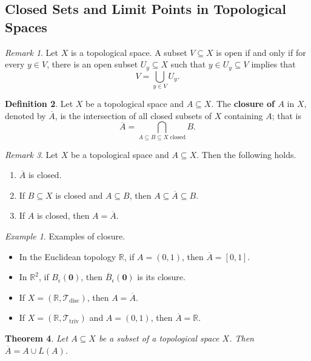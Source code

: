 \documentclass[ 12pt ]{article}
\newcounter{lecture_num}
\theoremstyle{plain}
\theoremstyle{plain}
\newtheorem{theorem}{Theorem}[lecture_num]
\theoremstyle{definition}
\newtheorem{definition}[theorem]{Definition}
\theoremstyle{remark}
\newtheorem{remark}[theorem]{Remark}
\newtheorem*{example*}{Example}
\begin{document}
\subsection*{Closed Sets and Limit Points in Topological Spaces}

\begin{remark}
	Let $X$ is a topological space. A subset $V \subseteq X$ is open if and only if for every $y \in V$, there is an open subset $U_y \subseteq X$ such that $y \in U_y \subseteq V$
	implies that $$V = \bigcup_{y \in V} U_y.$$
\end{remark}

\begin{definition}
	Let $X$ be a topological space and $A \subseteq X$. The \textbf{closure of $A$} in $X$, denoted by $\overline{A}$, is the intersection of all closed subsets of $X$ containing $A$;
	that is $$\overline{A} = \bigcap_{ A \subseteq B \subseteq X\; \mathrm{closed} } B.$$
\end{definition}

\begin{remark}
	Let $X$ be a topological space and $A \subseteq X$. Then the following holds.
	\begin{enumerate}
		\item $\overline{A}$ is closed.
		\item If $B \subseteq X$ is closed and $A \subseteq B$, then $A \subseteq \overline{A} \subseteq B$.
		\item If $A$ is closed, then $A = \overline{A}$.
	\end{enumerate}
\end{remark}

\begin{example*}
	Examples of closure.
	\begin{itemize}
		\item In the Euclidean topology $\mathbb{R}$, if $A = (0, 1)$, then $\overline{A} = [0, 1]$.
		\item In $\mathbb{R}^2$, if $B_\epsilon(\textbf{0})$, then $\overline{B}_\epsilon(\textbf{0})$ is its closure.
		\item If $X = (\mathbb{R}, \mathcal{T}_{\mathrm{disc}})$, then $A = \overline{A}$.
		\item If $X = (\mathbb{R}, \mathcal{T}_{\mathrm{triv}})$ and $A = (0, 1)$, then $\overline{A} = \mathbb{R}$.
	\end{itemize}
\end{example*}

\begin{theorem}
	Let $A \subseteq X$ be a subset of a topological space $X$. Then $\overline{A} = A \cup L(A)$.
\end{theorem}
\end{document}
